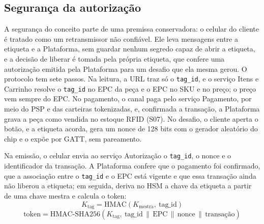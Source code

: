 \begin{figure}[htbp]
{%
    }
\end{figure}

\subsection{Segurança da autorização}

A segurança do conceito parte de uma premissa conservadora: o celular do cliente é tratado como um retransmissor não confiável. Ele leva mensagens entre a etiqueta e a Plataforma, sem guardar nenhum segredo capaz de abrir a etiqueta, e a decisão de liberar é tomada pela própria etiqueta, que confere uma autorização emitida pela Plataforma para um desafio que ela mesma gerou. O protocolo tem sete passos. Na leitura, a URL traz só o \texttt{tag\_id}, e o serviço Itens e Carrinho resolve o \texttt{tag\_id} no EPC da peça e o EPC no SKU e no preço; o preço vem sempre do EPC. No pagamento, o canal paga pelo serviço Pagamento, por meio do PSP e das carteiras tokenizadas, e, confirmada a transação, a Plataforma grava a peça como vendida no estoque RFID (S07). No desafio, o cliente aperta o botão, e a etiqueta acorda, gera um nonce de 128 bits com o gerador aleatório do chip e o expõe por GATT, sem pareamento.

Na emissão, o celular envia ao serviço Autorização o \texttt{tag\_id}, o nonce e o identificador da transação. A Plataforma confere que o pagamento foi confirmado, que a associação entre o \texttt{tag\_id} e o EPC está vigente e que essa transação ainda não liberou a etiqueta; em seguida, deriva no HSM a chave da etiqueta a partir de uma chave mestra e calcula o token:
\begin{equation}
    K_{\text{tag}} = \text{HMAC}\left(K_{\text{mestra}},\ \text{tag\_id}\right)
\end{equation}
\begin{equation}
    \text{token} = \text{HMAC-SHA256}\left(K_{\text{tag}},\ \text{tag\_id} \,\|\, \text{EPC} \,\|\, \text{nonce} \,\|\, \text{transação}\right)
\end{equation}

